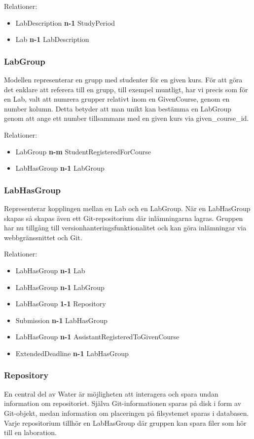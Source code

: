Relationer: 
\begin{itemize}
  \item LabDescription {\bf n-1} StudyPeriod 
  \item Lab {\bf n-1} LabDescription
\end{itemize}

\subsubsection{LabGroup}
Modellen representerar en grupp med studenter för en given kurs. För att göra det enklare att referera till en grupp, till exempel muntligt, har vi precis som för en Lab, valt att numrera grupper relativt inom en GivenCourse, genom en number kolumn. Detta betyder att man unikt kan bestämma en LabGroup genom att ange ett number tillsammans med en given kurs via given\_course\_id.

Relationer: 
\begin{itemize}
  \item LabGroup {\bf n-m} StudentRegisteredForCourse 
  \item LabHasGroup {\bf n-1} LabGroup
\end{itemize}

\subsubsection{LabHasGroup}\label{sec:modell-labhasgroup}
Representerar kopplingen mellan en Lab och en LabGroup. När en LabHasGroup skapas så skapas även ett Git-repositorium där inlämningarna lagras. Gruppen har nu tillgång till versionhanteringsfunktionalitet och kan göra inlämningar via webbgränssnittet och Git.

Relationer: 
\begin{itemize}
  \item LabHasGroup {\bf n-1} Lab 
  \item LabHasGroup {\bf n-1} LabGroup
  \item LabHasGroup {\bf 1-1} Repository
  \item Submission {\bf n-1} LabHasGroup
  \item LabHasGroup {\bf n-1} AssistantRegisteredToGivenCourse
  \item ExtendedDeadline {\bf n-1} LabHasGroup 
\end{itemize}

\subsubsection{Repository}
En central del av Water är möjligheten att interagera och spara undan information om repositoriet. Själva Git-informationen sparas på disk i form av Git-objekt, medan information om placeringen på filsystemet sparas i databasen. Varje repositorium tillhör en LabHasGroup där gruppen kan spara filer som hör till en laboration.

